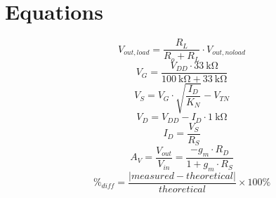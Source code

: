 \section{Equations}
\label{sec:equations}

%
\begin{equation}
  \label{eq:amp}
  V_{out,load} = \frac{R_L}{R_o + R_L} \cdot V_{out,no load}
\end{equation}
%
\begin{equation}
  \label{eq:V_G}
  V_G = \frac{V_{DD} \cdot \SI{33}{\kilo\ohm}}{\SI{100}{\kilo\ohm} + \SI{33}{\kilo\ohm}}
\end{equation}
%
\begin{equation}
  \label{eq:V_S}
  V_S = V_G \cdot \sqrt{\frac{I_D}{K_N}} - V_{TN}
\end{equation}
%
\begin{equation}
  \label{eq:V_D}
  V_D = V_{DD} - I_D \cdot \SI{1}{\kilo\ohm}
\end{equation}
%
\begin{equation}
  \label{eq:I_D}
  I_D = \frac{V_S}{R_S}
\end{equation}
%
\begin{equation}
  \label{eq:A_V}
  A_V = \frac{V_{out}}{V_{in}} = \frac{-g_m \cdot R_D}{1 + g_m \cdot R_S}
\end{equation}
%
\begin{equation}
  \label{eqn:percent_diff}
  \%_{diff} = \frac{|measured - theoretical|}{theoretical} \times 100\%
\end{equation}


